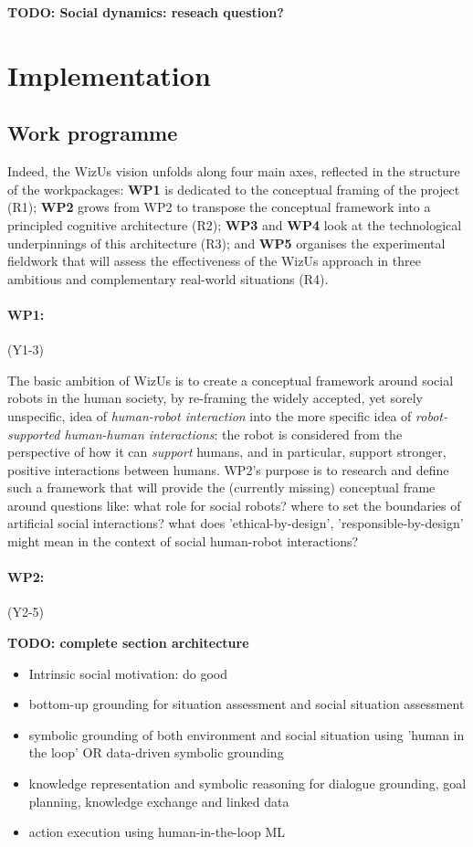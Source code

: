 \documentclass[11pt]{report}
\newcommand{\project}{WizUs\xspace}
\newcommand{\TODO}[1]{{\color{red}\textbf{TODO: #1}}}
\begin{document}
\TODO{Social dynamics: reseach question?}

\section{Implementation}

\subsection{Work programme}

Indeed, the \project vision unfolds along four main axes, reflected in the
structure of the workpackages: \textbf{WP1} is dedicated to the conceptual
framing of the project (R1); \textbf{WP2} grows from WP2 to transpose the
conceptual framework into a principled cognitive architecture (R2); \textbf{WP3}
and \textbf{WP4} look at the technological underpinnings of this architecture
(R3); and \textbf{WP5} organises the experimental fieldwork that will assess
the effectiveness of the \project approach in three ambitious and complementary
real-world situations (R4).

\paragraph{WP1: \textbf{\wpOne}} (Y1-3)

The basic ambition of \project is to create a conceptual framework
around social robots in the human society, by re-framing the widely accepted, yet
sorely unspecific, idea of \emph{human-robot interaction} into the more specific
idea of \emph{robot-supported human-human interactions}: the robot is considered
from the perspective of how it can \emph{support} humans, and in particular,
support stronger, positive interactions between humans. WP2's purpose is to research
and define such a framework that will
provide the (currently missing) conceptual frame around questions like: what role
for social robots? where to set the boundaries of artificial social
interactions? what does 'ethical-by-design', 'responsible-by-design' might mean
in the context of social human-robot interactions? 


\paragraph{WP2: \textbf{\wpTwo}} (Y2-5)

\TODO{complete section architecture}

\begin{itemize}
    \item Intrinsic social motivation: do good
    \item bottom-up grounding for situation assessment and social situation
        assessment
    \item symbolic grounding of both environment and social situation using
        'human in the loop' OR data-driven symbolic grounding
    \item knowledge representation and symbolic reasoning for dialogue
        grounding, goal planning, knowledge exchange and linked data
    \item action execution using human-in-the-loop ML
\end{itemize}
\end{document}
